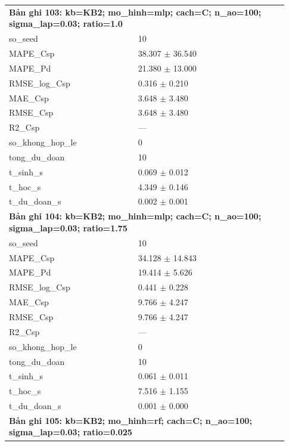 \begin{longtable}{p{0.43\linewidth}p{0.50\linewidth}}
\midrule
\multicolumn{2}{p{0.95\linewidth}}{\textbf{Bản ghi 103: kb=KB2; mo\_hinh=mlp; cach=C; n\_ao=100; sigma\_lap=0.03; ratio=1.0}} \\
so\_\allowbreak seed & 10 \\
MAPE\_\allowbreak Csp & 38.307 $\pm$ 36.540 \\
MAPE\_\allowbreak Pd & 21.380 $\pm$ 13.000 \\
RMSE\_\allowbreak log\_\allowbreak Csp & 0.316 $\pm$ 0.210 \\
MAE\_\allowbreak Csp & 3.648 $\pm$ 3.480 \\
RMSE\_\allowbreak Csp & 3.648 $\pm$ 3.480 \\
R2\_\allowbreak Csp & — \\
so\_\allowbreak khong\_\allowbreak hop\_\allowbreak le & 0 \\
tong\_\allowbreak du\_\allowbreak doan & 10 \\
t\_\allowbreak sinh\_\allowbreak s & 0.069 $\pm$ 0.012 \\
t\_\allowbreak hoc\_\allowbreak s & 4.349 $\pm$ 0.146 \\
t\_\allowbreak du\_\allowbreak doan\_\allowbreak s & 0.002 $\pm$ 0.001 \\
\midrule
\multicolumn{2}{p{0.95\linewidth}}{\textbf{Bản ghi 104: kb=KB2; mo\_hinh=mlp; cach=C; n\_ao=100; sigma\_lap=0.03; ratio=1.75}} \\
so\_\allowbreak seed & 10 \\
MAPE\_\allowbreak Csp & 34.128 $\pm$ 14.843 \\
MAPE\_\allowbreak Pd & 19.414 $\pm$ 5.626 \\
RMSE\_\allowbreak log\_\allowbreak Csp & 0.441 $\pm$ 0.228 \\
MAE\_\allowbreak Csp & 9.766 $\pm$ 4.247 \\
RMSE\_\allowbreak Csp & 9.766 $\pm$ 4.247 \\
R2\_\allowbreak Csp & — \\
so\_\allowbreak khong\_\allowbreak hop\_\allowbreak le & 0 \\
tong\_\allowbreak du\_\allowbreak doan & 10 \\
t\_\allowbreak sinh\_\allowbreak s & 0.061 $\pm$ 0.011 \\
t\_\allowbreak hoc\_\allowbreak s & 7.516 $\pm$ 1.155 \\
t\_\allowbreak du\_\allowbreak doan\_\allowbreak s & 0.001 $\pm$ 0.000 \\
\midrule
\multicolumn{2}{p{0.95\linewidth}}{\textbf{Bản ghi 105: kb=KB2; mo\_hinh=rf; cach=C; n\_ao=100; sigma\_lap=0.03; ratio=0.025}} \\

\end{longtable}
